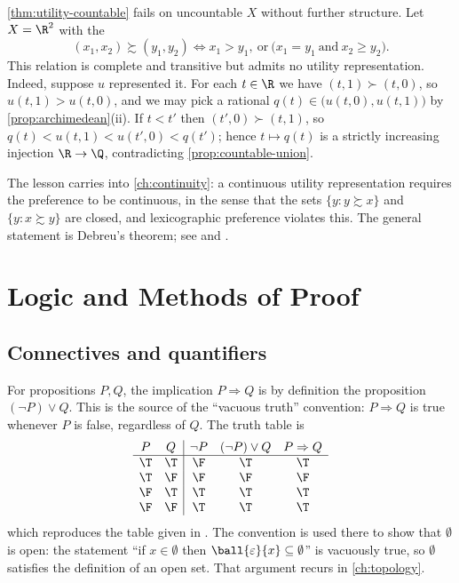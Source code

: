 \begin{remark}\label{rem:lexicographic}
	\autoref{thm:utility-countable} fails on uncountable $X$ without further
	structure. Let $X=\R^2$ with the 
	\[
		(x_1,x_2)\succsim(y_1,y_2)
		\iff
		x_1>y_1,\ \text{or}\ \bigl(x_1=y_1\ \text{and}\ x_2\geq y_2\bigr).
	\]
	This relation is complete and transitive but admits no utility representation.
	Indeed, suppose $u$ represented it. For each $t\in\R$ we have
	$(t,1)\succ(t,0)$, so $u(t,1)>u(t,0)$, and we may pick a rational
	$q(t)\in\bigl(u(t,0),u(t,1)\bigr)$ by \autoref{prop:archimedean}(ii). If
	$t<t'$ then $(t',0)\succ(t,1)$, so $q(t)<u(t,1)<u(t',0)<q(t')$; hence
	$t\mapsto q(t)$ is a strictly increasing injection $\R\to\Q$, contradicting
	\autoref{prop:countable-union}.

	The lesson carries into \autoref{ch:continuity}: a continuous utility
	representation requires the preference to be continuous, in the sense that the
	sets $\{y : y\succsim x\}$ and $\{y : x\succsim y\}$ are closed, and
	lexicographic preference violates this. The general statement is
	Debreu's theorem; see \textcite[Ch.~2]{ok2007real} and
	\textcite[Ch.~4]{corbae2009introduction}.
\end{remark}

\section{Logic and Methods of Proof}\label{sec:sets-logic}

\subsection{Connectives and quantifiers}

For propositions $P,Q$, the implication $P\Rightarrow Q$ is by definition the
proposition $(\neg P)\vee Q$. This is the source of the ``vacuous truth''
convention: $P\Rightarrow Q$ is true whenever $P$ is false, regardless of $Q$.
The truth table is
\[
	\begin{array}{cc|ccc}
		P  & Q  & \neg P & (\neg P)\vee Q & P\Rightarrow Q \\\hline
		\T & \T & \F     & \T             & \T             \\
		\T & \F & \F     & \F             & \F             \\
		\F & \T & \T     & \T             & \T             \\
		\F & \F & \T     & \T             & \T
	\end{array}
\]
which reproduces the table given in \autocite[slide 40]{fukuda2026analysis}. The
convention is used there to show that $\emptyset$ is open: the statement ``if
$x\in\emptyset$ then $\ball{\varepsilon}{x}\subseteq\emptyset$'' is vacuously
true, so $\emptyset$ satisfies the definition of an open set. That argument
recurs in \autoref{ch:topology}.

